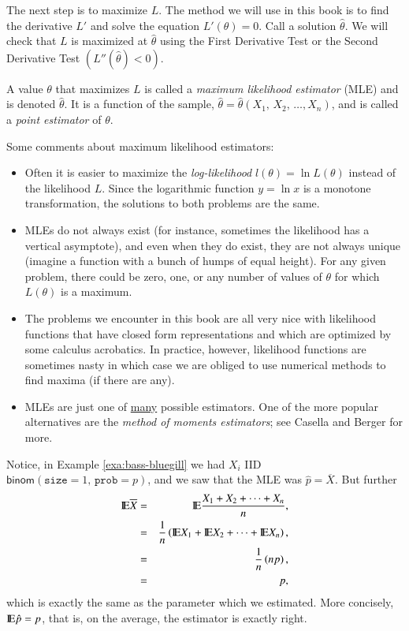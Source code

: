 \documentclass[captions=tableheading]{scrbook}
\begin{document}
The next step is to maximize \(L\). The method we will use in this book is to find the derivative \(L'\) and solve the equation \(L'(\theta)=0\). Call a solution \(\hat{\theta}\). We will check that \(L\) is maximized at \(\hat{\theta}\) using the First Derivative Test or the Second Derivative Test \(\left(L''(\hat{\theta})<0\right)\).

\begin{defn}
A value \(\theta\) that maximizes \(L\) is called a \emph{maximum likelihood estimator} (MLE) and is denoted \(\hat{\theta}\). It is a function of the sample, \(\hat{\theta}=\hat{\theta}\left(X_{1},\, X_{2},\,\ldots,X_{n}\right)\), and is called a \emph{point estimator} of \(\theta\).
\end{defn}

\begin{rem}
Some comments about maximum likelihood estimators:
\begin{itemize}
\item Often it is easier to maximize the \emph{log-likelihood} \(l(\theta)=\ln L(\theta)\) instead of the likelihood \(L\). Since the logarithmic function \(y=\ln x\) is a monotone transformation, the solutions to both problems are the same.
\item MLEs do not always exist (for instance, sometimes the likelihood has a vertical asymptote), and even when they do exist, they are not always unique (imagine a function with a bunch of humps of equal height). For any given problem, there could be zero, one, or any number of values of \(\theta\) for which \(L(\theta)\) is a maximum.
\item The problems we encounter in this book are all very nice with likelihood functions that have closed form representations and which are optimized by some calculus acrobatics. In practice, however, likelihood functions are sometimes nasty in which case we are obliged to use numerical methods to find maxima (if there are any).
\item MLEs are just one of \underline{many} possible estimators. One of the more popular alternatives are the \emph{method of moments estimators}; see Casella and Berger \cite{Casella2002} for more.
\end{itemize}

\end{rem}

Notice, in Example \ref{exa:bass-bluegill} we had \(X_{i}\) IID \(\mathsf{binom}(\mathtt{size}=1,\,\mathtt{prob}=p)\), and we saw that the MLE was \(\hat{p}=\overline{X}\). But further
\begin{eqnarray*}
\mathrm{I\hspace{-1.5pt}E}\overline{X} & = & \mathrm{I\hspace{-1.5pt}E}\frac{X_{1}+X_{2}+\cdots+X_{n}}{n},\\
 & = & \frac{1}{n}\left(\mathrm{I\hspace{-1.5pt}E} X_{1}+\mathrm{I\hspace{-1.5pt}E} X_{2}+\cdots+\mathrm{I\hspace{-1.5pt}E} X_{n}\right),\\
 & = & \frac{1}{n}\left(np\right),\\
 & = & p,
\end{eqnarray*}
which is exactly the same as the parameter which we estimated. More concisely, \(\mathrm{I\hspace{-1.5pt}E}\hat{p}=p\), that is, on the average, the estimator is exactly right.
\end{document}
